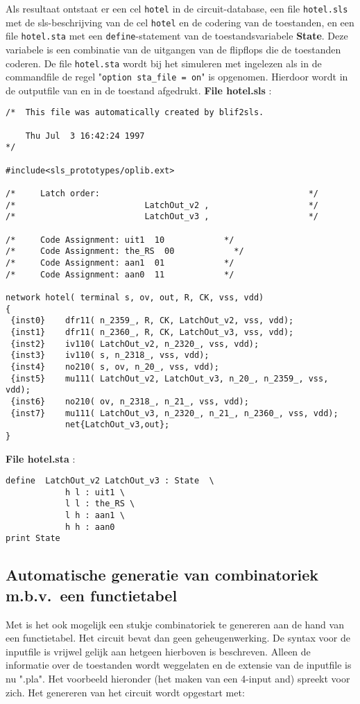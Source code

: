 Als resultaat ontstaat er een cel {\tt hotel} in de circuit-database, 
een file {\tt hotel.sls} met de sls-beschrijving van de cel {\tt hotel} en de 
codering van de toestanden, en een file {\tt hotel.sta} met een 
{\tt define}-statement van de toestandsvariabele {\bf State}. 
Deze variabele is een combinatie van de uitgangen van de flipflops die
de toestanden coderen.
De file {\tt hotel.sta} wordt bij het simuleren met  ingelezen als in de 
commandfile de regel "{\tt option sta\_file = on}" is opgenomen. Hierdoor wordt in de outputfile van  en in  de toestand afgedrukt.
\clearpage
{\bf File hotel.sls} :
\begin{verbatim}
/*  This file was automatically created by blif2sls.

    Thu Jul  3 16:42:24 1997
*/

#include<sls_prototypes/oplib.ext>

/*     Latch order:                                          */
/*                          LatchOut_v2 ,                    */
/*                          LatchOut_v3 ,                    */

/*     Code Assignment: uit1  10            */
/*     Code Assignment: the_RS  00            */
/*     Code Assignment: aan1  01            */
/*     Code Assignment: aan0  11            */

network hotel( terminal s, ov, out, R, CK, vss, vdd)
{
 {inst0}    dfr11( n_2359_, R, CK, LatchOut_v2, vss, vdd);
 {inst1}    dfr11( n_2360_, R, CK, LatchOut_v3, vss, vdd);
 {inst2}    iv110( LatchOut_v2, n_2320_, vss, vdd);
 {inst3}    iv110( s, n_2318_, vss, vdd);
 {inst4}    no210( s, ov, n_20_, vss, vdd);
 {inst5}    mu111( LatchOut_v2, LatchOut_v3, n_20_, n_2359_, vss, vdd);
 {inst6}    no210( ov, n_2318_, n_21_, vss, vdd);
 {inst7}    mu111( LatchOut_v3, n_2320_, n_21_, n_2360_, vss, vdd);
            net{LatchOut_v3,out};
}
\end{verbatim}

{\bf File hotel.sta} :
\begin{verbatim}
define  LatchOut_v2 LatchOut_v3 : State  \
            h l : uit1 \
            l l : the_RS \
            l h : aan1 \
            h h : aan0
print State
\end{verbatim}

\clearpage
\subsection{Automatische generatie van combinatoriek m.b.v.\ een functietabel}
Met  is het ook mogelijk een stukje combinatoriek te genereren aan
de hand van een functietabel. Het circuit bevat dan geen geheugenwerking.
De syntax voor de inputfile is vrijwel gelijk aan hetgeen hierboven is 
beschreven. Alleen de informatie over de toestanden wordt weggelaten en de extensie van de inputfile is nu ".pla". Het voorbeeld hieronder (het maken van een 4-input and) spreekt voor zich. Het genereren van het circuit wordt 
opgestart met: \type{kissis and4.pla}

